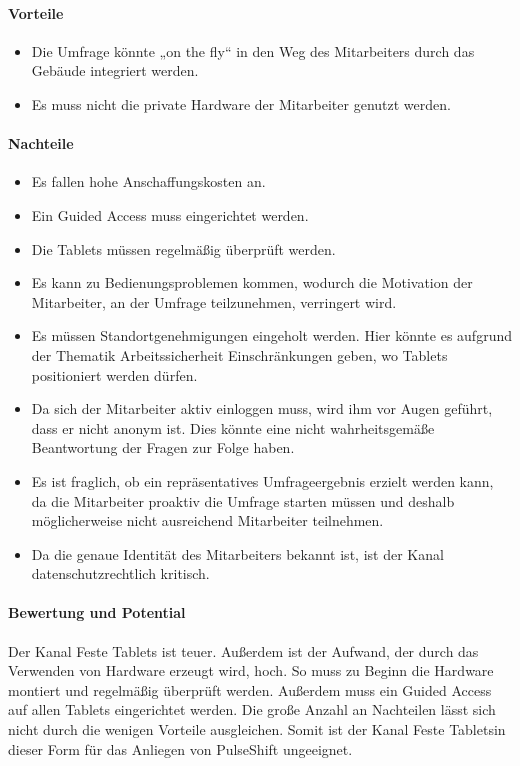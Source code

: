 \paragraph{Vorteile}

\begin{itemize}
\item Die Umfrage könnte „on the fly“ in den Weg des Mitarbeiters durch das Gebäude integriert werden.
\item Es muss nicht die private Hardware der Mitarbeiter genutzt werden.
\end{itemize}

\paragraph{Nachteile}

\begin{itemize}
\item Es fallen hohe Anschaffungskosten an.
\item Ein Guided Access muss eingerichtet werden.
\item Die Tablets müssen regelmäßig überprüft werden.
\item Es kann zu Bedienungsproblemen kommen, wodurch die Motivation der Mitarbeiter, an der Umfrage teilzunehmen, verringert wird.
\item Es müssen Standortgenehmigungen eingeholt werden. Hier könnte es aufgrund der Thematik Arbeitssicherheit Einschränkungen geben, wo Tablets positioniert werden dürfen.
\item Da sich der Mitarbeiter aktiv einloggen muss, wird ihm vor Augen geführt, dass er nicht anonym ist. Dies könnte eine nicht wahrheitsgemäße Beantwortung der Fragen zur Folge haben.
\item Es ist fraglich, ob ein repräsentatives Umfrageergebnis erzielt werden kann, da die Mitarbeiter proaktiv die Umfrage starten müssen und deshalb möglicherweise nicht ausreichend Mitarbeiter teilnehmen.
\item Da die genaue Identität des Mitarbeiters bekannt ist, ist der Kanal datenschutzrechtlich kritisch.
\end{itemize}

\paragraph{Bewertung und Potential}

Der Kanal \glqq Feste Tablets \grqq ist teuer. Außerdem ist der Aufwand, der durch das Verwenden von Hardware erzeugt wird, hoch. So muss zu Beginn die Hardware montiert und regelmäßig überprüft werden. Außerdem muss ein Guided Access auf allen Tablets eingerichtet werden. Die große Anzahl an Nachteilen lässt sich nicht durch die wenigen Vorteile ausgleichen. Somit ist der Kanal \glqq Feste Tablets\grqq in dieser Form für das Anliegen von PulseShift ungeeignet.

